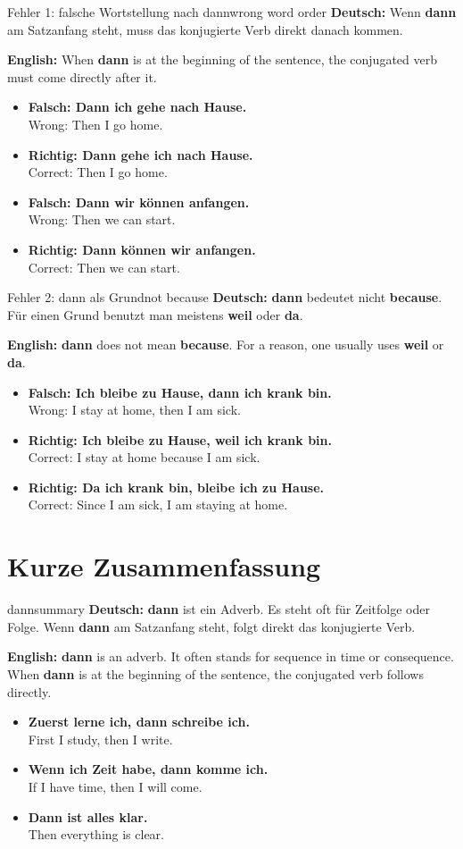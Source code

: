 \documentclass[a4paper,11pt]{article}
\newcommand{\GermanText}[1]{\textbf{Deutsch: }#1\par}
\newcommand{\EnglishText}[1]{{\small\color{SoftGray}\textbf{English: }#1\par}}
\newcommand{\ExampleItem}[2]{\item \textbf{#1}\\{\small\color{SoftGray}#2}}
\begin{document}
\begin{grammarentry}{Fehler 1: falsche Wortstellung nach dann}{wrong word order}
\GermanText{Wenn \textbf{dann} am Satzanfang steht, muss das konjugierte Verb direkt danach kommen.}
\EnglishText{When \textbf{dann} is at the beginning of the sentence, the conjugated verb must come directly after it.}

\begin{exbox}
\begin{itemize}
    \ExampleItem{Falsch: Dann ich gehe nach Hause.}{Wrong: Then I go home.}
    \ExampleItem{Richtig: Dann gehe ich nach Hause.}{Correct: Then I go home.}
    \ExampleItem{Falsch: Dann wir können anfangen.}{Wrong: Then we can start.}
    \ExampleItem{Richtig: Dann können wir anfangen.}{Correct: Then we can start.}
\end{itemize}
\end{exbox}
\end{grammarentry}

\begin{grammarentry}{Fehler 2: dann als Grund}{not because}
\GermanText{\textbf{dann} bedeutet nicht \textbf{because}. Für einen Grund benutzt man meistens \textbf{weil} oder \textbf{da}.}
\EnglishText{\textbf{dann} does not mean \textbf{because}. For a reason, one usually uses \textbf{weil} or \textbf{da}.}

\begin{exbox}
\begin{itemize}
    \ExampleItem{Falsch: Ich bleibe zu Hause, dann ich krank bin.}{Wrong: I stay at home, then I am sick.}
    \ExampleItem{Richtig: Ich bleibe zu Hause, weil ich krank bin.}{Correct: I stay at home because I am sick.}
    \ExampleItem{Richtig: Da ich krank bin, bleibe ich zu Hause.}{Correct: Since I am sick, I am staying at home.}
\end{itemize}
\end{exbox}
\end{grammarentry}

\section{Kurze Zusammenfassung}

\begin{grammarentry}{dann}{summary}
\GermanText{\textbf{dann} ist ein Adverb. Es steht oft für Zeitfolge oder Folge. Wenn \textbf{dann} am Satzanfang steht, folgt direkt das konjugierte Verb.}
\EnglishText{\textbf{dann} is an adverb. It often stands for sequence in time or consequence. When \textbf{dann} is at the beginning of the sentence, the conjugated verb follows directly.}

\begin{exbox}
\begin{itemize}
    \ExampleItem{Zuerst lerne ich, dann schreibe ich.}{First I study, then I write.}
    \ExampleItem{Wenn ich Zeit habe, dann komme ich.}{If I have time, then I will come.}
    \ExampleItem{Dann ist alles klar.}{Then everything is clear.}
\end{itemize}
\end{exbox}
\end{grammarentry}
\end{document}
